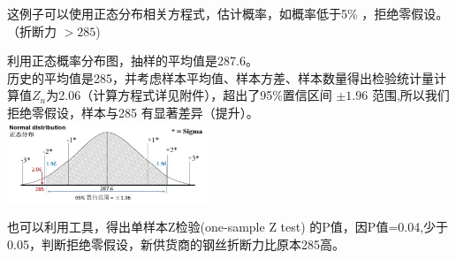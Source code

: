 这例子可以使用正态分布相关方程式，估计概率，如概率低于5\%
，拒绝零假设。（折断力 \(> 285\))

利用正态概率分布图，抽样的平均值是287.6。\\
历史的平均值是285，并考虑样本平均值、样本方差、样本数量得出检验统计量计算值\(Z_n\)为2.06（计算方程式详见附件），超出了95\%置信区间
\(\pm 1.96\) 范围,所以我们拒绝零假设，样本与285 有显著差异（提升）。\\

\includegraphics[width=6cm]{M4SingleMean1Screenshot_2022-09-11_201026.jpg}

也可以利用工具，得出单样本Z检验(one-sample Z test)
的P值，因P值=0.04,少于0.05，判断拒绝零假设，新供货商的钢丝折断力比原本285高。


